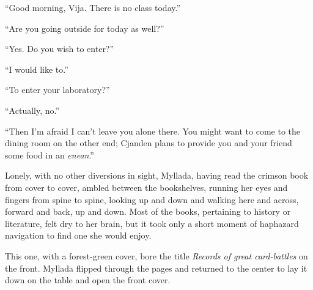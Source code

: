 ``Good morning, Vija. There is no class today.''

``Are you going outside for today as well?''

``Yes. Do you wish to enter?''

``I would like to.''

``To enter your laboratory?''

``Actually, no.''

``Then I'm afraid I can't leave you alone there. You might want to come to the dining room on the other end; Cjanden plans to provide you and your friend some food in an \emph{enean}.''

Lonely, with no other diversions in sight, Myllada, having read the crimson book from cover to cover, ambled between the bookshelves, running her eyes and fingers from spine to spine, looking up and down and walking here and across, forward and back, up and down. Most of the books, pertaining to history or literature, felt dry to her brain, but it took only a short moment of haphazard navigation to find one she would enjoy.

This one, with a forest-green cover, bore the title \emph{Records of great card-battles} on the front. Myllada flipped through the pages and returned to the center to lay it down on the table and open the front cover.

